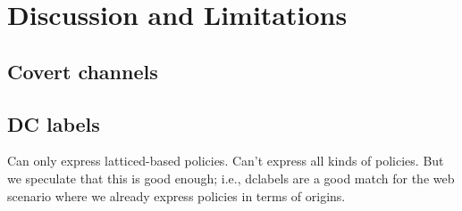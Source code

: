 \section{Discussion and Limitations}
\label{sec:discussion}


\subsection{Covert channels}

\subsection{DC labels}
Can only express latticed-based policies. Can't express all kinds of
policies. But we speculate that this is good enough; i.e., dclabels
are a good match for the web scenario where we already express
policies in terms of origins.

